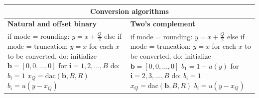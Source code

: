\begin{center}
\begin{tabular}{|p{}|p{}|}
\hline
	\multicolumn{2}{|c|}{\textbf{Conversion algorithms}}\\
	\hline
	\textbf{Natural and offset binary}
		& \textbf{Two's complement}\\
	\hline
	if mode = rounding:\newline
		\hspace*{0.5cm} $y = x + \frac{Q}{2}$\newline
	else if mode = truncation:\newline
		\hspace*{0.5cm} $y = x$\newline
	for each $x$ to be converted, do:\newline
		\hspace*{0.5cm} initialize $\mathbf{b}=[0,0,\dots ,0]$\newline
		\hspace*{0.5cm} for $\mathbf{i}=1,2,\dots , B$ do:\newline
		\hspace*{1cm}$b_i = 1$\newline
		\hspace*{1cm}$x_Q = \text{dac}(\mathbf{b}, B, R)$\newline
		\hspace*{1cm}$b_i = u(y-x_Q)$
		& if mode = rounding: \newline
		\hspace*{0.5cm} $y = x + \frac{Q}{2}$ \newline
		else if mode = truncation: \newline
		\hspace*{0.5cm} $y = x$ \newline
		for each $x$ to be converted, do:\newline
		\hspace*{0.5cm} initialize $\mathbf{b}=[0,0,\dots ,0]$\newline
		\hspace*{0.5cm} $b_1 = 1- u(y)$ \newline
		\hspace*{0.5cm} for $\mathbf{i}=2,3,\dots , B$ do:\newline
		\hspace*{1cm}$b_i = 1$\newline
		\hspace*{1cm}$x_Q = \text{dac}(\mathbf{b}, B, R)$\newline
		\hspace*{1cm}$b_i = u(y-x_Q)$\\
	\hline
\end{tabular}
\end{center}

